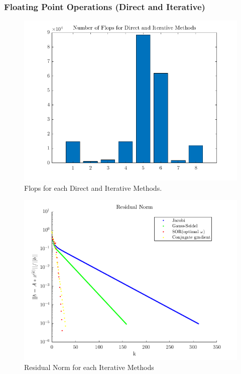 \documentclass[12pt,a4paper]{article}
\begin{document}
\subsubsection{Floating Point Operations (Direct and Iterative)}
\begin{figure}[H]
	\includegraphics[width=\linewidth]{images/FlopsGraph.png}
	\caption{Flops for each Direct and Iterative Methods.}
	\label{fig:flops}
\end{figure}

\begin{figure}[H]
	\includegraphics[width=\linewidth]{images/ResidualNormGraph.png}
	\caption{Residual Norm for each Iterative Methods}
	\label{fig:res}
\end{figure}
\end{document}
